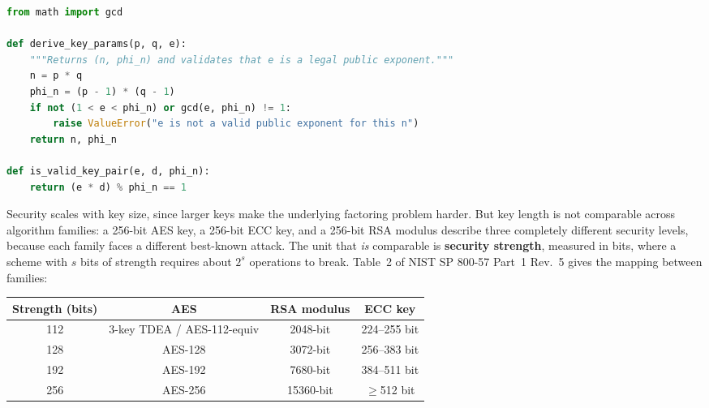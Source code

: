 \begin{lstlisting}[language=Python, caption={Deriving and validating RSA key parameters from two primes}]
from math import gcd

def derive_key_params(p, q, e):
    """Returns (n, phi_n) and validates that e is a legal public exponent."""
    n = p * q
    phi_n = (p - 1) * (q - 1)
    if not (1 < e < phi_n) or gcd(e, phi_n) != 1:
        raise ValueError("e is not a valid public exponent for this n")
    return n, phi_n

def is_valid_key_pair(e, d, phi_n):
    return (e * d) % phi_n == 1
\end{lstlisting}

Security scales with key size, since larger keys make the underlying factoring problem harder. But
key length is not comparable across algorithm families: a 256-bit AES key, a 256-bit ECC key, and a
256-bit RSA modulus describe three completely different security levels, because each family faces a
different best-known attack. The unit that \emph{is} comparable is \textbf{security strength},
measured in bits, where a scheme with $s$ bits of strength requires about $2^s$ operations to break.
Table~2 of NIST SP 800-57 Part~1 Rev.~5 gives the mapping between families:

\begin{center}
\begin{tabular}{cccc}
\toprule
\textbf{Strength (bits)} & \textbf{AES} & \textbf{RSA modulus} & \textbf{ECC key} \\
\midrule
112 & 3-key TDEA / AES-112-equiv & 2048-bit & 224--255 bit \\
128 & AES-128 & 3072-bit & 256--383 bit \\
192 & AES-192 & 7680-bit & 384--511 bit \\
256 & AES-256 & 15360-bit & $\geq$512 bit \\
\bottomrule
\end{tabular}
\end{center}

